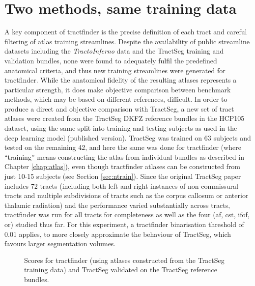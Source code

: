 \documentclass[12pt,phd,a4paper,twoside]{ucl_thesis}
\providecommand{\DIFaddtex}[1]{{\protect\color{blue} \sf #1}} %
\providecommand{\DIFaddbegin}{} %
\providecommand{\DIFaddend}{} %
\providecommand{\DIFadd}[1]{\texorpdfstring{\DIFaddtex{#1}}{#1}} %
\newcommand{\DIFaddincludegraphics}[2][]{{\color{blue}\fbox{\DIFOincludegraphics[#1]{#2}}}} %
\DeclareRobustCommand{\DIFaddbegin}{\DIFOaddbegin \let\includegraphics\DIFaddincludegraphics} %
\DeclareRobustCommand{\DIFaddend}{\DIFOaddend \let\includegraphics\DIFOincludegraphics} %
\begin{document}
\section{Two methods, same training data}\label{sec:tractseg}

A key component of tractfinder is the precise definition of each tract and careful filtering of atlas training streamlines.
Despite the availability of public streamline datasets including the \textit{TractoInferno} data and the TractSeg training and validation bundles, none were found to adequately fulfil the predefined anatomical criteria, and thus new training streamlines were generated for tractfinder.
While the anatomical fidelity of the resulting atlases represents a particular strength, it does make objective comparison between benchmark methods, which may be based on different references, difficult.
In order to produce a direct and objective comparison with TractSeg, a new set of tract atlases were created from the TractSeg DKFZ reference bundles\autocite{Wasserthal2018b} in the HCP105 dataset, using the same split into training and testing subjects as used in the deep learning model (published version).
TractSeg was trained on 63 subjects and tested on the remaining 42, and here the same was done for tractfinder (where ``training'' means constructing the atlas from individual bundles as described in Chapter \ref{chap:atlas}), even though tractfinder atlases can be constructed from just 10-15 subjects (see Section \ref{sec:ntrain}).
Since the original TractSeg paper includes 72 tracts (including both left and right instances of non-commissural tracts and multiple subdivisions of tracts such as the corpus callosum or anterior thalamic radiation) and the performance varied substantially across tracts, tractfinder was run for all tracts for completeness as well as the four (\gls{af}, \gls{cst}, \gls{ifof}, \gls{or}) studied thus far.
\DIFaddbegin \DIFadd{For this experiment, a tractfinder binarisation threshold of 0.01 applies, to more closely approximate the behaviour of TractSeg, which favours larger segmentation volumes.
}\DIFaddend 

\begin{figure}[htb!]
  \caption[Direct comparison between tractfinder and TractSeg, all metrics]{Scores for tractfinder (using atlases constructed from the TractSeg training data) and TractSeg validated on the TractSeg reference bundles.}
  \label{fig:ts_atlas}
\end{figure}
\end{document}
